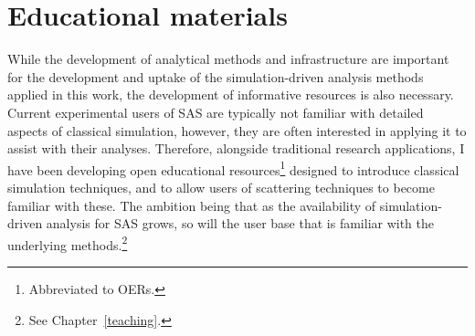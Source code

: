 \section{Educational materials}
While the development of analytical methods and infrastructure are important for the development and uptake of the simulation-driven analysis methods applied in this work, the development of informative resources is also necessary.
Current experimental users of SAS are typically not familiar with detailed aspects of classical simulation, however, they are often interested in applying it to assist with their analyses.
Therefore, alongside traditional research applications, I have been developing open educational resources\footnote{Abbreviated to OERs.} designed to introduce classical simulation techniques, and to allow users of scattering techniques to become familiar with these.
The ambition being that as the availability of simulation-driven analysis for SAS grows, so will the user base that is familiar with the underlying methods.\footnote{See Chapter~\ref{teaching}.}
